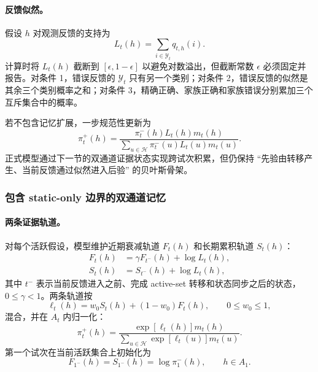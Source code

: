 \paragraph{反馈似然。}
假设 $h$ 对观测反馈的支持为
\begin{equation}
    L_t(h)
    =
    \sum_{i\in\mathcal Y_t}q_{t,h}(i).
    \label{eq:modelv2-feedback-likelihood}
\end{equation}
计算时将 $L_t(h)$ 截断到 $[\epsilon,1-\epsilon]$ 以避免对数溢出，但截断常数 $\epsilon$ 必须固定并报告。对条件 1，错误反馈的 $\mathcal Y_t$ 只有另一个类别；对条件 2，错误反馈的似然是其余三个类别概率之和；对条件 3，精确正确、家族正确和家族错误分别累加三个互斥集合中的概率。

若不包含记忆扩展，一步规范性更新为
\begin{equation}
    \pi_t^+(h)
    =
    \frac{
        \pi_t^-(h)L_t(h)m_t(h)
    }{
        \sum_{u\in\mathcal H}
        \pi_t^-(u)L_t(u)m_t(u)
    }.
    \label{eq:modelv2-standard-bayes}
\end{equation}
正式模型通过下一节的双通道证据状态实现跨试次积累，但仍保持 ``先验由转移产生、当前反馈通过似然进入后验'' 的贝叶斯骨架。


\subsubsection{包含 static-only 边界的双通道记忆}

\paragraph{两条证据轨道。}
对每个活跃假设，模型维护近期衰减轨道 $F_t(h)$ 和长期累积轨道 $S_t(h)$：
\begin{align}
    F_t(h)
    &=\gamma F_{t^-}(h)+\log L_t(h),\\
    S_t(h)
    &=S_{t^-}(h)+\log L_t(h),
    \label{eq:modelv2-dual-memory}
\end{align}
其中 $t^-$ 表示当前反馈进入之前、完成 active-set 转移和状态同步之后的状态，$0\leq\gamma<1$。两条轨道按
\begin{equation}
    \ell_t(h)
    =
    w_0S_t(h)+(1-w_0)F_t(h),
    \qquad 0\leq w_0\leq1 ,
    \label{eq:modelv2-memory-mixture}
\end{equation}
混合，并在 $A_t$ 内归一化：
\begin{equation}
    \pi_t^+(h)
    =
    \frac{
        \exp[\ell_t(h)]m_t(h)
    }{
        \sum_{u\in\mathcal H}
        \exp[\ell_t(u)]m_t(u)
    } .
    \label{eq:modelv2-memory-posterior}
\end{equation}
第一个试次在当前活跃集合上初始化为
\begin{equation}
    F_{1^-}(h)=S_{1^-}(h)=\log\pi_1^-(h),
    \qquad h\in A_1.
    \label{eq:modelv2-memory-initialization}
\end{equation}

